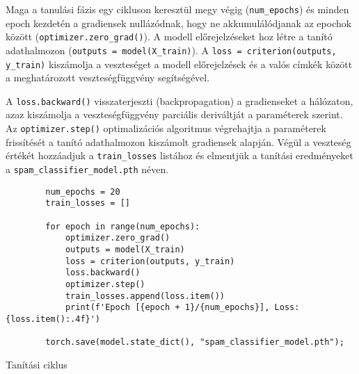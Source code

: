\begin{flushleft}
    Maga a tanulási fázis egy cikluson keresztül megy végig (\verb|num_epochs|) és minden epoch kezdetén a gradiensek nullázódnak, hogy ne akkumulálódjanak az epochok között (\verb|optimizer.zero_grad()|). A modell előrejelzéseket hoz létre a tanító adathalmozon (\verb|outputs = model(X_train)|). A \verb|loss = criterion(outputs, y_train)| kiszámolja a veszteséget a modell előrejelzések és a valós címkék között a meghatározott veszteségfüggvény segítségével.
\end{flushleft}
\begin{flushleft}
    A \verb|loss.backward()| visszaterjeszti (backpropagation) a gradienseket a hálózaton, azaz kiszámolja a veszteségfüggvény parciális deriváltját a paraméterek szerint. Az \verb|optimizer.step()| optimalizációs algoritmus végrehajtja a paraméterek frissítését a tanító adathalmozon kiszámolt gradiensek alapján. Végül a veszteség értékét hozzáadjuk a \verb|train_losses| listához és elmentjük a tanítási eredményeket a \verb|spam_classifier_model.pth| néven.
\end{flushleft}
\begin{listing}[H]
    \begin{verbatim}
        num_epochs = 20
        train_losses = []

        for epoch in range(num_epochs):
            optimizer.zero_grad()
            outputs = model(X_train)
            loss = criterion(outputs, y_train)
            loss.backward()
            optimizer.step()
            train_losses.append(loss.item())
            print(f'Epoch [{epoch + 1}/{num_epochs}], Loss: {loss.item():.4f}')

        torch.save(model.state_dict(), "spam_classifier_model.pth");
    \end{verbatim}
    \caption{Tanítási ciklus}
    \label{code:tloop}
\end{listing}

